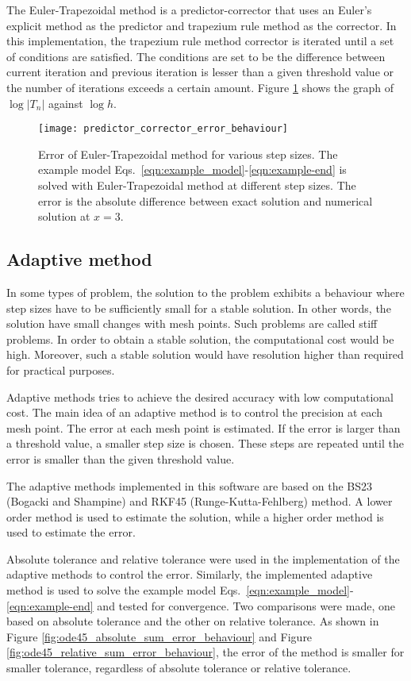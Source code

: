The Euler-Trapezoidal method is a predictor-corrector that uses an Euler's explicit method as the predictor and trapezium rule method as the corrector. In this implementation, the trapezium rule method corrector is iterated until a set of conditions are satisfied. The conditions are set to be the difference between current iteration and previous iteration is lesser than a given threshold value or the number of iterations exceeds a certain amount. Figure \ref{fig:predictor_corrector_error_behaviour} shows the graph of $\log |T_n|$ against $\log h$.

\begin{figure}
    \texttt{[image: predictor\_corrector\_error\_behaviour]}
    \caption{Error of Euler-Trapezoidal method for various step sizes. The example model Eqs.~\eqref{eqn:example_model}-\eqref{eqn:example-end} is solved with Euler-Trapezoidal method at different step sizes. The error is the absolute difference between exact solution and numerical solution at $x=3$.}
    \label{fig:predictor_corrector_error_behaviour}
\end{figure}

\subsection{Adaptive method}
\label{sec:adaptive-method}
In some types of problem, the solution to the problem exhibits a behaviour where step sizes have to be sufficiently small for a stable solution. In other words, the solution have small changes with mesh points. Such problems are called stiff problems. In order to obtain a stable solution, the computational cost would be high. Moreover, such a stable solution would have resolution higher than required for practical purposes.

Adaptive methods tries to achieve the desired accuracy with low computational cost. The main idea of an adaptive method is to control the precision at each mesh point. The error at each mesh point is estimated. If the error is larger than a threshold value, a smaller step size is chosen. These steps are repeated until the error is smaller than the given threshold value.

The adaptive methods implemented in this software are based on the BS23 (Bogacki and Shampine) and RKF45 (Runge-Kutta-Fehlberg) method. A lower order method is used to estimate the solution, while a higher order method is used to estimate the error. 

Absolute tolerance and relative tolerance were used in the implementation of the adaptive methods to control the error. Similarly, the implemented adaptive method is used to solve the example model Eqs.~\eqref{eqn:example_model}-\eqref{eqn:example-end} and tested for convergence. Two comparisons were made, one based on absolute tolerance and the other on relative tolerance. As shown in Figure \ref{fig:ode45_absolute_sum_error_behaviour} and Figure \ref{fig:ode45_relative_sum_error_behaviour}, the error of the method is smaller for smaller tolerance, regardless of absolute tolerance or relative tolerance.

